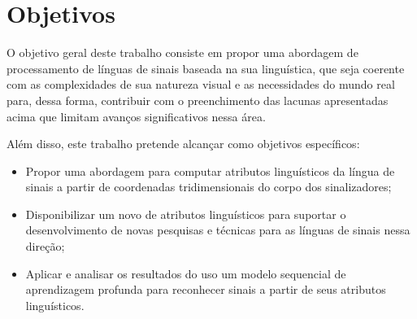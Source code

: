 \section{Objetivos}
\label{sec:introducao-objetivos}

O objetivo geral deste trabalho consiste em propor uma abordagem de processamento de línguas de sinais baseada na sua linguística, que seja coerente com as complexidades de sua natureza visual e as necessidades do mundo real para, dessa forma, contribuir com o preenchimento das lacunas apresentadas acima que limitam avanços significativos nessa área.


Além disso, este trabalho pretende alcançar como objetivos específicos:

\begin{itemize}
    \item Propor uma abordagem para computar atributos linguísticos da língua de sinais a partir de coordenadas tridimensionais do corpo dos sinalizadores;
    \item Disponibilizar um novo \dataset de atributos linguísticos para suportar o desenvolvimento de novas pesquisas e técnicas para as línguas de sinais nessa direção;
    \item Aplicar e analisar os resultados do uso um modelo sequencial de aprendizagem profunda para reconhecer sinais a partir de seus atributos linguísticos.
\end{itemize}


    

